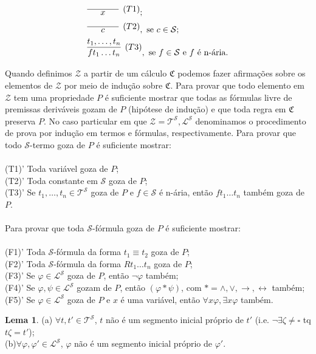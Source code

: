 \documentclass[11pt]{article}
\theoremstyle{definition}
\newtheorem{lemma}{Lema}
\newcommand{\sse}{\leftrightarrow}
\newcommand{\mc}[1]{\mathcal{#1}}
\newcommand{\mf}[1]{\mathfrak{#1}}
\begin{document}
\begin{align*}
    & \infer[(T1)]{x}{\phantom{aaaaaaa}};\\
    & \infer[(T2)]{c}{\phantom{aaaaaaa}}, \text{ se }c\in\mc{S};\\
    & \infer[(T3)]{ft_1\dots t_n}{t_1,\dots,t_n},\text{ se }f\in\mc{S}\text{ e }f\text{ é n-ária}.
\end{align*}

Quando definimos $\mc{Z}$ a partir de um cálculo $\mf{C}$ podemos fazer afirmações sobre os elementos de $\mc{Z}$ por meio de indução sobre $\mf{C}$. Para provar que todo elemento em $\mc{Z}$ tem uma propriedade $P$ é suficiente mostrar que todas as fórmulas livre de premissas deriváveis gozam de $P$ (hipótese de indução) e que toda regra em $\mf{C}$ preserva $P$. No caso particular em que $\mc{Z}=\mc{T}^\mc{S},\mc{L}^\mc{S}$ denominamos o procedimento de prova por indução em termos e fórmulas, respectivamente. Para provar que todo $\mc{S}$-termo goza de $P$ é suficiente mostrar:\\\\
(T1)' Toda variável goza de $P$;\\
(T2)' Toda constante em $\mc{S}$ goza de $P$;\\
(T3)' Se $t_1,\dots,t_n\in\mc{T}^\mc{S}$ goza de $P$ e $f\in\mc{S}$ é n-ária, então $ft_1\dots t_n$ também goza de $P$.\\\\
Para provar que toda $\mc{S}$-fórmula goza de $P$ é suficiente mostrar:\\\\
(F1)' Toda $\mc{S}$-fórmula da forma $t_1\equiv t_2$ goza de $P$;\\
(F2)' Toda $\mc{S}$-fórmula da forma $Rt_1\dots t_n$ goza de $P$;\\
(F3)' Se $\varphi\in\mc{L}^\mc{S}$ goza de $P$, então $\neg\varphi$ também;\\
(F4)' Se $\varphi,\psi\in\mc{L}^\mc{S}$ gozam de $P$, então $(\varphi*\psi)$, com $*=\wedge,\vee,\to,\sse$ também;\\
(F5)' Se $\varphi\in\mc{L}^\mc{S}$ goza de $P$ e $x$ é uma variável, então $\forall x\varphi,\exists x\varphi$ também.

\begin{lemma}
(a) $\forall t,t'\in\mc{T}^\mc{S}$, $t$ não é um segmento inicial próprio de $t'$ (i.e. $\neg\exists\zeta\ne\square$ tq $t\zeta=t'$);\\
(b)$\forall\varphi,\varphi'\in\mc{L}^\mc{S}$, $\varphi$ não é um segmento inicial próprio de $\varphi'$.
\end{lemma}
\end{document}
